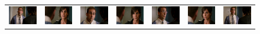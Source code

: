 \begin{figure}
\begin{center}
\begin{tabular}{c c c c c c c}

\includegraphics[width=0.11\linewidth]
  {fig/pat1/dinnerForSchmucks/01.jpg}
& \includegraphics[width=0.11\linewidth]
  {fig/pat1/dinnerForSchmucks/02.jpg}
& \includegraphics[width=0.11\linewidth]
  {fig/pat1/dinnerForSchmucks/03.jpg}
& \includegraphics[width=0.11\linewidth]
  {fig/pat1/dinnerForSchmucks/04.jpg}
& \includegraphics[width=0.11\linewidth]
  {fig/pat1/dinnerForSchmucks/05.jpg}
& \includegraphics[width=0.11\linewidth]
  {fig/pat1/dinnerForSchmucks/06.jpg}
& \includegraphics[width=0.11\linewidth]
  {fig/pat1/dinnerForSchmucks/07.jpg}
\\


\end{tabular}
\end{center}
\end{figure}
